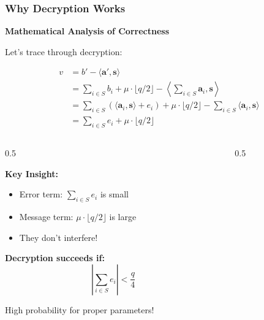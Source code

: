 \documentclass[aspectratio=169,10pt]{beamer}
\newcommand{\slideheader}[1]{\frametitle{#1}}
\theoremstyle{plain}
\begin{document}
\begin{frame}
  \slideheader{Why Decryption Works}
  
  \begin{center}
    \textbf{\large Mathematical Analysis of Correctness}
  \end{center}
  
  \vspace{0.3cm}
  
  Let's trace through decryption:
  
  \begin{align}
    v &= b' - \langle \mathbf{a}', \mathbf{s} \rangle\\
    &= \sum_{i \in S} b_i + \mu \cdot \lfloor q/2 \rfloor - \left\langle \sum_{i \in S} \mathbf{a}_i, \mathbf{s} \right\rangle\\
    &= \sum_{i \in S} (\langle \mathbf{a}_i, \mathbf{s} \rangle + e_i) + \mu \cdot \lfloor q/2 \rfloor - \sum_{i \in S} \langle \mathbf{a}_i, \mathbf{s} \rangle\\
    &= \sum_{i \in S} e_i + \mu \cdot \lfloor q/2 \rfloor
  \end{align}
  
  \vspace{0.3cm}
  
  \begin{columns}[T]
    \begin{column}{0.5\textwidth}

    \begin{blueBox}
      \textbf{Key Insight:}
      \begin{itemize}
        \item Error term: $\sum_{i \in S} e_i$ is small
        \item Message term: $\mu \cdot \lfloor q/2 \rfloor$ is large
        \item They don't interfere!
      \end{itemize}
    \end{blueBox}
    
    \vspace{0.3cm}
    
    \textbf{Decryption succeeds if:}
    $$\left|\sum_{i \in S} e_i\right| < \frac{q}{4}$$
    
    High probability for proper parameters!
  
    \end{column}
    \begin{column}{0.5\textwidth}


\end{column}
\end{columns}
\end{frame}
\end{document}
